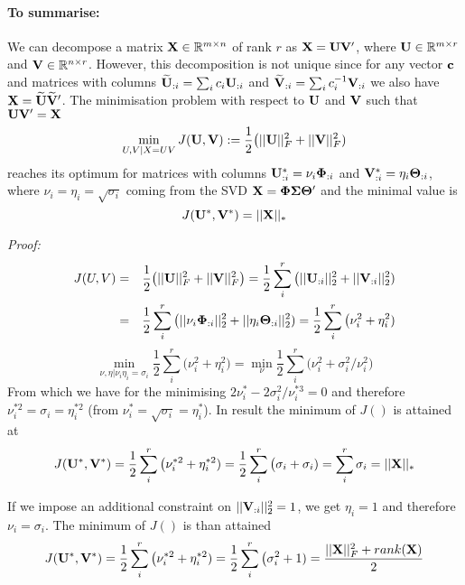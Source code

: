 \paragraph{To summarise:} We can decompose a matrix $\mathbf{X} \in \mathbb{R}^{m \times n}$ of rank $r$ as $\mathbf{X} = \mathbf{UV'}$, where $\mathbf{U} \in \mathbb{R}^{m \times r}$ and $\mathbf{V} \in \mathbb{R}^{n \times r}$.
However, this decomposition is not unique since for any vector $\mathbf{c}$ and matrices with columns $\widetilde{\mathbf{U}}_{:i} = \sum_i c_i \mathbf{U}_{:i}$ and $\widetilde{\mathbf{V}}_{:i} = \sum_i c^{-1}_i \mathbf{V}_{:i}$ we also have $\mathbf{X} = \widetilde{\mathbf{U}} \widetilde{\mathbf{V}}'$.
The minimisation problem with respect to $\mathbf{U}$ and $\mathbf{V}$ such that $\mathbf{U} \mathbf{V}' = \mathbf{X}$
\begin{equation}
 \min_{U,V | X = UV} J(\mathbf{U},\mathbf{V}) := \frac{1}{2} \big( ||\mathbf{U}||_F^2 + ||\mathbf{V}||_F^2 )
\end{equation}
reaches its optimum for matrices with columns $\mathbf{U}^*_{:i} = \nu_i \mathbf{\Phi}_{:i}$ and $\mathbf{V}^*_{:i} = \eta_i \mathbf{\Theta}_{:i}$, where $\nu_i = \eta_i = \sqrt{\sigma_i}$ coming from the SVD $\mathbf{X} = \mathbf{\Phi \Sigma \Theta'}$ and the minimal value is
\begin{equation}
 J(\mathbf{U}^*,\mathbf{V}^*) = ||\mathbf{X}||_*
\end{equation}


\begin{small}
\emph{Proof:}
\begin{eqnarray*}
J(U,V) & = &  \frac{1}{2} \big( ||\vc{U}||_F^2 + ||\vc{V}||_F^2 \big) = \frac{1}{2} \sum_i^r \big( ||\vc{U}_{:i}||_2^2 + ||\vc{V}_{:i}||_2^2 )\\
& = & \frac{1}{2} \sum_i^r \big( ||\nu_i \vc{\Phi}_{:i}||_2^2 + ||\eta_i \vc{\Theta}_{:i}||_2^2 )
= \frac{1}{2} \sum_i^r \big( \nu_i^2  + \eta_i^2) %
\end{eqnarray*}
\begin{equation}
 \min_{\nu,\eta | \nu_i \eta_i = \sigma_i} \frac{1}{2} \sum_i^r \big( \nu_i^2  + \eta_i^2)
 = \min_{\nu} \frac{1}{2} \sum_i^r \big( \nu_i^2  + \sigma_i^2/\nu_i^2)
\end{equation}
From which we have for the minimising $2\nu_i^{*} - 2\sigma_i^2/\nu_i^{*3} = 0$ and therefore $\nu_i^{*2} = \sigma_i = \eta_i^{*2}$ (from $\nu_i^* = \sqrt{\sigma_i} = \eta_i^*$).
In result the minimum of $J()$ is attained at 
\begin{equation}
 J(\mathbf{U}^*,\mathbf{V}^*) = \frac{1}{2} \sum_i^r \big( \nu_i^{*2}  + \eta_i^{*2}) = \frac{1}{2} \sum_i^r \big( \sigma_i  + \sigma_i) = \sum_i^r \sigma_i = ||\mathbf{X}||_*
\end{equation}

If we impose an additional constraint on $||\mathbf{V}_{:i}||_2^2 = 1$, we get $\eta_i = 1$ and therefore $\nu_i = \sigma_i$.
The minimum of $J()$ is than attained
\begin{equation}
 J(\mathbf{U}^*,\mathbf{V}^*) = \frac{1}{2} \sum_i^r \big( \nu_i^{*2}  + \eta_i^{*2}) = \frac{1}{2} \sum_i^r \big( \sigma_i^2  + 1) = \frac{||\mathbf{X}||_F^2 + rank(\mathbf{X})}{2}
\end{equation}
\end{small}

